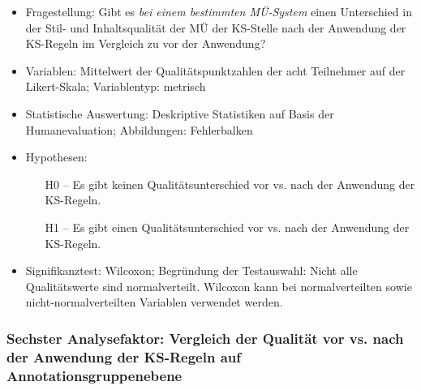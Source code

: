 \begin{itemize}
\item Fragestellung: Gibt es \textit{bei einem bestimmten MÜ-System} einen Unterschied in der Stil- und Inhaltsqualität der MÜ der KS-Stelle nach der Anwendung der KS-Regeln im Vergleich zu vor der Anwendung?

\item Variablen: Mittelwert der Qualitätspunktzahlen der acht Teilnehmer auf der Likert-Skala; Variablentyp: metrisch

\item Statistische Auswertung: Deskriptive Statistiken auf Basis der Humanevaluation; Abbildungen: Fehlerbalken

\item Hypothesen:

\begin{itemize}

\item[H0 --] Es gibt keinen Qualitätsunterschied vor vs. nach der Anwendung der KS-Regeln.

\item[H1 --] Es gibt einen Qualitätsunterschied vor vs. nach der Anwendung der KS-Regeln.

\end{itemize}
\item Signifikanztest: Wilcoxon; Begründung der Testauswahl: Nicht alle Qualitätswerte sind normalverteilt. Wilcoxon kann bei normalverteilten sowie nicht-normalverteilten Variablen verwendet werden.

\end{itemize}

\subsubsection*{Sechster Analysefaktor: Vergleich der Qualität vor vs. nach der Anwendung der KS-Regeln auf Annotationsgruppenebene}

